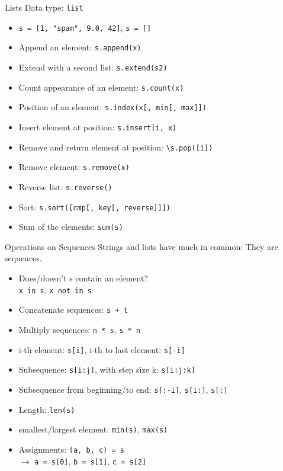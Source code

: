 \begin{frame}{Lists}
Data type: \alert{\lstinline{list}}
\begin{itemize}
\item \lstinline{s = [1, "spam", 9.0, 42]}, \;\lstinline{s = []}
\item \alert{Append an element}: \lstinline{s.append(x)}
\item Extend with a second list: \lstinline{s.extend(s2)}
\item Count appearance of an element: \lstinline{s.count(x)}
\item Position of an element: \lstinline{s.index(x[, min[, max]])}
\item Insert element at position: \lstinline{s.insert(i, x)}
\item Remove and return element at position: \lstinline{\s.pop([i])}
\item \alert{Remove element}: \lstinline{s.remove(x)}
\item Reverse list: \lstinline{s.reverse()}
\item \alert{Sort}: \lstinline{s.sort([cmp[, key[, reverse]]])}
\item Sum of the elements: \lstinline{sum(s)}
\end{itemize}
\end{frame}

\begin{frame}{Operations on Sequences}
Strings and lists have much in common: They are \alert{sequences}.
\begin{itemize}
\item Does/doesn't s contain an element?\\
 \lstinline{x in s}, \lstinline{x not in s}
\item Concatenate sequences: \lstinline{s + t}
\item Multiply sequences: \lstinline{n * s}, \lstinline{s * n}
\item \alert{i-th element}: \lstinline{s[i]}, \alert{i-th to last  element}: \lstinline{s[-i]}
\item Subsequence: \lstinline{s[i:j]}, with step size k: \lstinline{s[i:j:k]}
\item Subsequence from beginning/to end: \lstinline{s[:-i]}, \lstinline{s[i:]}, \lstinline{s[:]}
\item \alert{Length}: \lstinline{len(s)}
\item smallest/largest element: \lstinline{min(s)}, \lstinline{max(s)}
\item Assignments: \lstinline{(a, b, c) = s} \\
$\rightarrow$ \lstinline{a = s[0]}, \lstinline{b = s[1]}, \lstinline{c = s[2]}
\end{itemize}
\end{frame}


